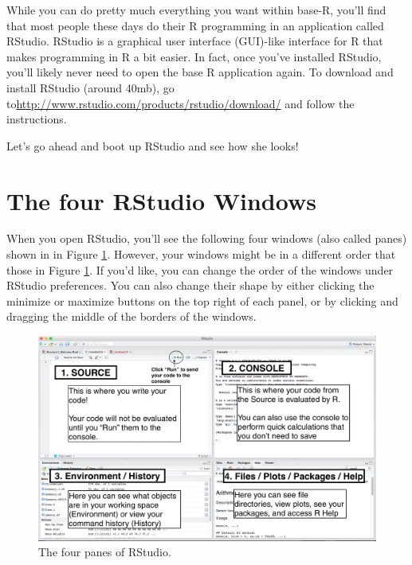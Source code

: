 \documentclass[
]{book}
\begin{document}
While you can do pretty much everything you want within base-R, you'll find that most people these days do their R programming in an application called RStudio. RStudio is a graphical user interface (GUI)-like interface for R that makes programming in R a bit easier. In fact, once you've installed RStudio, you'll likely never need to open the base R application again. To download and install RStudio (around 40mb), go to\url{http://www.rstudio.com/products/rstudio/download/}\textbar{} and follow the instructions.

Let's go ahead and boot up RStudio and see how she looks!

\hypertarget{the-four-rstudio-windows}{%
\section{The four RStudio Windows}\label{the-four-rstudio-windows}}

When you open RStudio, you'll see the following four windows (also called panes) shown in in Figure \ref{fig:rstudiowindows}. However, your windows might be in a different order that those in Figure \ref{fig:rstudiowindows}. If you'd like, you can change the order of the windows under RStudio preferences. You can also change their shape by either clicking the minimize or maximize buttons on the top right of each panel, or by clicking and dragging the middle of the borders of the windows.

\begin{figure}

{\centering \includegraphics[width=1\linewidth]{images/RStudio_Screenshot_Labels} 

}

\caption{The four panes of RStudio.}\label{fig:rstudiowindows}
\end{figure}
\end{document}
